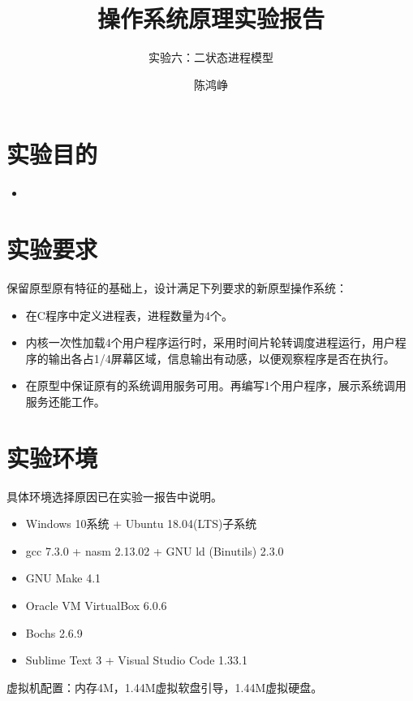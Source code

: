 \documentclass[logo,reportComp]{thesis}
\title{操作系统原理实验报告}
\subtitle{实验六：二状态进程模型}
\author{陈鸿峥}
\begin{document}
\maketitle

\section{实验目的}
\begin{itemize}
	\item 
\end{itemize}

\section{实验要求}
保留原型原有特征的基础上，设计满足下列要求的新原型操作系统：
\begin{itemize}
	\item 在C程序中定义进程表，进程数量为4个。
	\item 内核一次性加载4个用户程序运行时，采用时间片轮转调度进程运行，用户程序的输出各占1/4屏幕区域，信息输出有动感，以便观察程序是否在执行。
	\item 在原型中保证原有的系统调用服务可用。再编写1个用户程序，展示系统调用服务还能工作。
\end{itemize}

\section{实验环境}
具体环境选择原因已在实验一报告中说明。
\begin{itemize}
	\item Windows 10系统 + Ubuntu 18.04(LTS)子系统
	\item gcc 7.3.0 + nasm 2.13.02 + GNU ld (Binutils) 2.3.0
    \item GNU Make 4.1
	\item Oracle VM VirtualBox 6.0.6
    \item Bochs 2.6.9
	\item Sublime Text 3 + Visual Studio Code 1.33.1
\end{itemize}

虚拟机配置：内存4M，1.44M虚拟软盘引导，1.44M虚拟硬盘。
\end{document}
